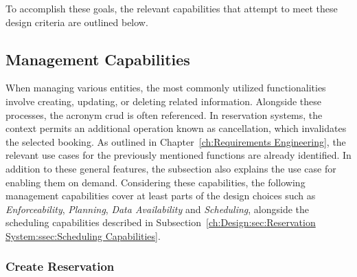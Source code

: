 \noindent To accomplish these goals, the relevant capabilities that attempt to meet these design criteria are outlined below.

\subsection{Management Capabilities}
\label{ch:Design:sec:Reservation System:ssec:Management Capabilities}

When managing various entities, the most commonly utilized functionalities involve creating, updating, or deleting related information. Alongside these processes, the acronym \acrshort{crud} is often referenced. In reservation systems, the context permits an additional operation known as cancellation, which invalidates the selected booking.
As outlined in Chapter~\ref{ch:Requirements Engineering}, the relevant use cases for the previously mentioned functions are already identified. In addition to these general features, the subsection also explains the use case for enabling them on demand.
Considering these capabilities, the following management capabilities cover at least parts of the design choices such as \textit{Enforceability}, \textit{Planning}, \textit{Data Availability} and \textit{Scheduling}, alongside the scheduling capabilities described in Subsection~\ref{ch:Design:sec:Reservation System:ssec:Scheduling Capabilities}.

\newpage

\subsubsection{Create Reservation}
\label{ch:Design:sec:Reservation System:ssec:Management Capabilities:sssec:Create Reservation}

